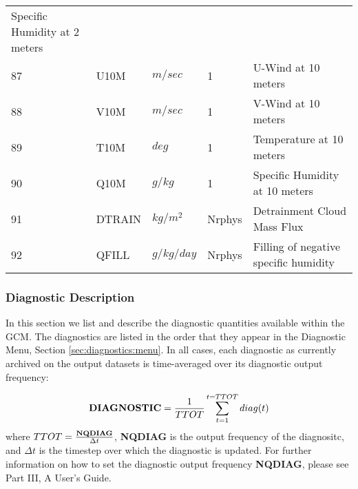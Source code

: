 \begin{tabular}{lllll}
\begin{minipage}[t]{3in}
          {Specific Humidity at 2 meters}
         \end{minipage}\\
87 & U10M    & $m/sec$ &    1
         &\begin{minipage}[t]{3in}
          {U-Wind at 10 meters}
         \end{minipage}\\
88 & V10M    & $m/sec$ &    1
         &\begin{minipage}[t]{3in}
          {V-Wind at 10 meters}
         \end{minipage}\\
89 & T10M    & $deg$ &    1
         &\begin{minipage}[t]{3in}
          {Temperature at 10 meters}
         \end{minipage}\\
90 & Q10M    & $g/kg$ &    1
         &\begin{minipage}[t]{3in}
          {Specific Humidity at 10 meters}
         \end{minipage}\\
91 & DTRAIN  & $kg/m^2$ &    Nrphys
         &\begin{minipage}[t]{3in}
          {Detrainment Cloud Mass Flux}
         \end{minipage}\\
92 & QFILL   & $g/kg/day$ &    Nrphys
         &\begin{minipage}[t]{3in}
          {Filling of negative specific humidity}
         \end{minipage}\\

\end{tabular}
\vspace{1.5in}
\vfill

\newpage

\subsubsection{Diagnostic Description}

In this section we list and describe the diagnostic quantities available within the 
GCM.  The diagnostics are listed in the order that they appear in the 
Diagnostic Menu, Section \ref{sec:diagnostics:menu}.
In all cases, each diagnostic as currently archived on the output datasets
is time-averaged over its diagnostic output frequency:

\[
{\bf DIAGNOSTIC} = {1 \over TTOT} \sum_{t=1}^{t=TTOT} diag(t)
\]
where $TTOT = {{\bf NQDIAG} \over \Delta t}$, {\bf NQDIAG} is the 
output frequency of the diagnositc, and $\Delta t$ is
the timestep over which the diagnostic is updated.  For further information on how
to set the diagnostic output frequency {\bf NQDIAG}, please see Part III, A User's Guide.

